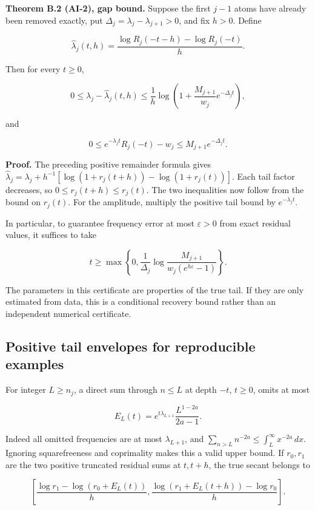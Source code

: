 \textbf{Theorem B.2 (AI-2), gap bound.} Suppose the first \(j-1\) atoms have
already been removed exactly, put
\(\Delta_j=\lambda_j-\lambda_{j+1}>0\), and fix \(h>0\). Define

\[
 \widehat\lambda_j(t,h)
 =\frac{\log R_j(-t-h)-\log R_j(-t)}h.
\]

Then for every \(t\ge0\),

\[
 0\le\lambda_j-\widehat\lambda_j(t,h)
 \le\frac1h\log\!\left(1+\frac{M_{j+1}}{w_j}e^{-\Delta_jt}\right),
\]

and

\[
 0\le e^{-\lambda_jt}R_j(-t)-w_j
     \le M_{j+1}e^{-\Delta_jt}.
\]

\textbf{Proof.} The preceding positive remainder formula gives
\(\widehat\lambda_j=\lambda_j+h^{-1}[\log(1+r_j(t+h))-\log(1+r_j(t))]\).
Each tail factor decreases, so \(0\le r_j(t+h)\le r_j(t)\). The two
inequalities now follow from the bound on \(r_j(t)\). For the amplitude,
multiply the positive tail bound by \(e^{-\lambda_jt}\).

In particular, to guarantee frequency error at most \(\varepsilon>0\)
from exact residual values, it suffices to take

\[
 t\ge\max\left\{0,\frac1{\Delta_j}
      \log\frac{M_{j+1}}{w_j(e^{h\varepsilon}-1)}\right\}.
\]

The parameters in this certificate are properties of the true tail. If
they are only estimated from data, this is a conditional recovery bound
rather than an independent numerical certificate.

\hypertarget{positive-tail-envelopes-for-reproducible-examples}{%
\subsection{Positive tail envelopes for reproducible
examples}\label{positive-tail-envelopes-for-reproducible-examples}}

For integer \(L\ge n_j\), a direct sum through \(n\le L\) at depth
\(-t\), \(t\ge0\), omits at most

\[
 E_L(t)=e^{t\lambda_{L+1}}\frac{L^{1-2a}}{2a-1}.
\]

Indeed all omitted frequencies are at most \(\lambda_{L+1}\), and
\(\sum_{n>L}n^{-2a}\le\int_L^\infty x^{-2a}\,dx\). Ignoring
squarefreeness and coprimality makes this a valid upper bound. If
\(r_0,r_1\) are the two positive truncated residual sums at \(t,t+h\),
the true secant belongs to

\[
 \left[
 \frac{\log r_1-\log(r_0+E_L(t))}h,
 \frac{\log(r_1+E_L(t+h))-\log r_0}h
 \right].
\]

